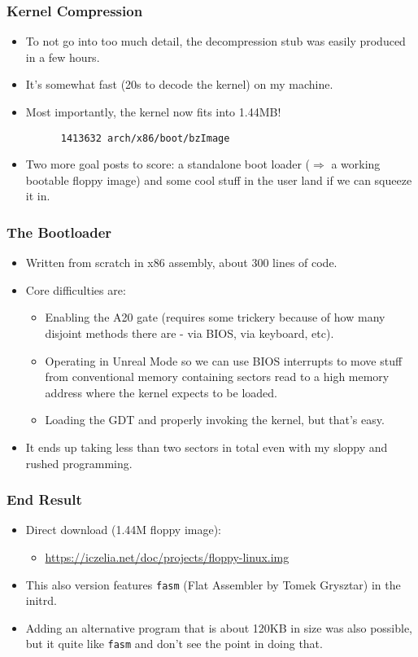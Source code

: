 \documentclass{beamer}
\begin{document}
\begin{frame}[t,fragile]
\frametitle{Kernel Compression}
  \begin{itemize}
    \item To not go into too much detail, the decompression stub was easily produced in a few hours.
    \item It's somewhat fast (20s to decode the kernel) on my machine.
    \item Most importantly, the kernel now fits into 1.44MB!
    \begin{Verbatim}
      1413632 arch/x86/boot/bzImage
    \end{Verbatim}
    \item Two more goal posts to score: a standalone boot loader ($\Rightarrow$ a working bootable floppy image) and some cool stuff in the user land if we can squeeze it in.
  \end{itemize}
\end{frame}

\begin{frame}[t,fragile]
\frametitle{The Bootloader}
  \begin{itemize}
    \item Written from scratch in x86 assembly, about 300 lines of code.
    \item Core difficulties are:
    \begin{itemize}
      \item Enabling the A20 gate (requires some trickery because of how many disjoint methods there are - via BIOS, via keyboard, etc).
      \item Operating in Unreal Mode so we can use BIOS interrupts to move stuff from conventional memory containing sectors read to a high memory address where the kernel expects to be loaded.
      \item Loading the GDT and properly invoking the kernel, but that's easy.
    \end{itemize}
    \item It ends up taking less than two sectors in total even with my sloppy and rushed programming.
  \end{itemize}
\end{frame}

\begin{frame}[t,fragile]
\frametitle{End Result}
  \begin{itemize}
    \item Direct download (1.44M floppy image):
    \begin{itemize}
      \item \url{https://iczelia.net/doc/projects/floppy-linux.img}
    \end{itemize}
    \item This also version features \verb|fasm| (Flat Assembler by Tomek Grysztar) in the initrd.
    \item Adding an alternative program that is about 120KB in size was also possible, but it quite like \verb|fasm| and don't see the point in doing that.
  \end{itemize}
\end{frame}
\end{document}
